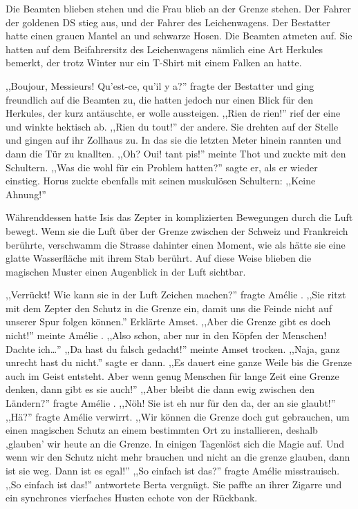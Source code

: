 \documentclass[11pt,titlepage,a5paper]{book}
\newcommand{\am}{Amélie }
\begin{document}
Die Beamten blieben stehen und die Frau blieb an der Grenze stehen. Der Fahrer der goldenen DS stieg aus, und der Fahrer des Leichenwagens. Der Bestatter hatte einen grauen Mantel an und schwarze Hosen. Die Beamten atmeten auf. Sie hatten auf dem Beifahrersitz des Leichenwagens nämlich eine Art Herkules bemerkt, der trotz Winter nur ein T-Shirt mit einem Falken an hatte. 

,,Boujour, Messieurs! Qu'est-ce, qu'il y a?'' fragte der Bestatter und ging freundlich auf die Beamten zu, die hatten jedoch nur einen Blick für den Herkules, der kurz antäuschte, er wolle aussteigen. ,,Rien de rien!'' rief der eine und winkte hektisch ab. ,,Rien du tout!'' der andere. Sie drehten auf der Stelle und gingen auf ihr Zollhaus zu. In das sie die letzten Meter hinein rannten und dann die Tür zu knallten. ,,Oh? Oui! tant pis!'' meinte Thot und zuckte mit den Schultern. ,,Was die wohl für ein Problem hatten?'' sagte er, als er wieder einstieg. Horus zuckte ebenfalls mit seinen muskulösen Schultern: ,,Keine Ahnung!'' 

 Währenddessen hatte Isis das Zepter in komplizierten Bewegungen durch die Luft bewegt. Wenn sie die Luft über der Grenze zwischen der Schweiz und Frankreich berührte, verschwamm die Strasse dahinter einen Moment, wie als hätte sie eine glatte Wasserfläche mit ihrem Stab berührt. Auf diese Weise blieben die magischen Muster einen Augenblick in der Luft sichtbar. 
 
,,Verrückt! Wie kann sie in der Luft Zeichen machen?'' fragte \am . ,,Sie ritzt mit dem Zepter den Schutz in die Grenze ein, damit uns die Feinde nicht auf unserer Spur folgen können.'' Erklärte Amset. ,,Aber die Grenze gibt es doch nicht!'' meinte \am . ,,Also schon, aber nur in den Köpfen der Menschen! Dachte ich\dots '' ,,Da hast du falsch gedacht!'' meinte Amset trocken. ,,Naja, ganz unrecht hast du nicht.'' sagte er dann. ,,Es dauert eine ganze Weile bis die Grenze auch im Geist entsteht. Aber wenn genug Menschen für lange Zeit eine Grenze denken, dann gibt es sie auch!'' ,,Aber bleibt die dann ewig zwischen den Ländern?'' fragte \am . ,,Nöh! Sie ist eh nur für den da, der an sie glaubt!'' ,,Hä?'' fragte \am verwirrt. ,,Wir können die Grenze doch gut gebrauchen, um einen magischen Schutz an einem bestimmten Ort zu installieren, deshalb ,glauben' wir heute an die Grenze. In einigen Tagenlöst sich die Magie auf. Und wenn wir den Schutz nicht mehr brauchen und nicht an die grenze glauben, dann ist sie weg. Dann ist es egal!'' ,,So einfach ist das?'' fragte \am misstrauisch. ,,So einfach ist das!'' antwortete Berta vergnügt. Sie paffte an ihrer Zigarre und ein synchrones vierfaches Husten echote von der Rückbank.
\end{document}
